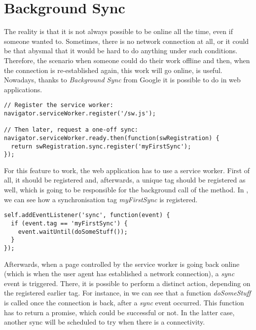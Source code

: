 \section{Background Sync}
\label{BackgroundSync}

The reality is that it is not always possible to be online all the time, even if someone wanted to. Sometimes, there is no network connection at all, or it could be that abysmal that it would be hard to do anything under such conditions. Therefore, the scenario when someone could do their work offline and then, when the connection is re-established again, this work will go online, is useful. Nowadays, thanks to \textit{Background Sync}\cite{38} from Google it is possible to do in web applications. 

\begin{lstlisting}[caption={[Code for registration of a sync event for a Service Worker]Code, which demonstrates how to register sync (\textit{myFirstSync} here) event for the service worker\cite{38}.}, label={lst:tech8}]
// Register the service worker:
navigator.serviceWorker.register('/sw.js');

// Then later, request a one-off sync:
navigator.serviceWorker.ready.then(function(swRegistration) {
  return swRegistration.sync.register('myFirstSync');
});
\end{lstlisting} 

For this feature to work, the web application has to use a service worker. First of all, it should be registered and, afterwards, a unique tag should be registered as well, which is going to be responsible for the background call of the method. In , we can see how a synchronisation tag \textit{myFirstSync} is registered.

\begin{lstlisting}[caption={[Code for calling a specific function when sync event triggered]Code, which demonstates that a function \textit{doSomeStuff} called, when the \textit{sync} event happened\cite{38}.}, label={lst:tech9}]
self.addEventListener('sync', function(event) {
  if (event.tag == 'myFirstSync') {
    event.waitUntil(doSomeStuff());
  }
});
\end{lstlisting} 

Afterwards, when a page controlled by the service worker is going back online (which is when the user agent has established a network connection\cite{44}), a \textit{sync} event is triggered. There, it is possible to perform a distinct action, depending on the registered earlier tag. For instance, in  we can see that a function \textit{doSomeStuff} is called once the connection is back, after a \textit{sync} event occurred. This function has to return a promise, which could be successful or not. In the latter case, another sync will be scheduled to try when there is a connectivity\cite{38}. 

